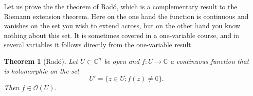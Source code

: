 \documentclass[12pt,openany]{book}
\newcommand{\C}{{\mathbb{C}}}
\newcommand{\sO}{{\mathscr{O}}}
\theoremstyle{plain}
\newtheorem{thm}{Theorem}[section]
\theoremstyle{remark}
\theoremstyle{definition}
\theoremstyle{exercise}
\theoremstyle{example}
\begin{document}
Let us prove the the theorem of 
Rad\'o, which is a complementary result to the Riemann extension theorem.
Here on the one hand the function is
continuous and vanishes on the set you wish to extend across, but on the
other hand you know nothing about this set.
It is sometimes covered in a one-variable course,
and in several variables it follows directly from
the one-variable result.

\begin{thm}[Rad\'o] \label{thm:rado}
Let $U \subset \C^n$ be open and $f \colon U \to \C$ a continuous
function that is holomorphic on the set
\begin{equation*}
U' = \bigl\{ z \in U : f(z) \not= 0 \bigr\} .
\end{equation*}
Then $f \in \sO(U)$.
\end{thm}
\end{document}

